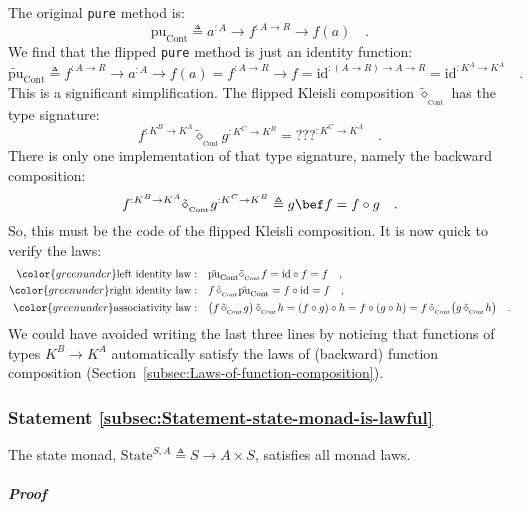 The original \lstinline!pure! method is:
\[
\text{pu}_{\text{Cont}}\triangleq a^{:A}\rightarrow f^{:A\rightarrow R}\rightarrow f(a)\quad.
\]
We find that the flipped \lstinline!pure! method is just an identity
function:
\[
\tilde{\text{pu}}_{\text{Cont}}\triangleq f^{:A\rightarrow R}\rightarrow a^{:A}\rightarrow f(a)=f^{:A\rightarrow R}\rightarrow f=\text{id}^{:\left(A\rightarrow R\right)\rightarrow A\rightarrow R}=\text{id}^{:K^{A}\rightarrow K^{A}}\quad.
\]
This is a significant simplification. The flipped Kleisli composition
$\tilde{\diamond}_{_{\text{Cont}}}$ has the type signature:
\[
f^{:K^{B}\rightarrow K^{A}}\tilde{\diamond}_{_{\text{Cont}}}g^{:K^{C}\rightarrow K^{B}}=\text{???}^{:K^{C}\rightarrow K^{A}}\quad.
\]
There is only one implementation of that type signature, namely the
backward composition:
\[
f^{:K^{B}\rightarrow K^{A}}\tilde{\diamond}_{_{\text{Cont}}}g^{:K^{C}\rightarrow K^{B}}\triangleq g\bef f=f\circ g\quad.
\]
So, this must be the code of the flipped Kleisli composition. It is
now quick to verify the laws:
\begin{align*}
{\color{greenunder}\text{left identity law}:}\quad & \tilde{\text{pu}}_{\text{Cont}}\tilde{\diamond}_{_{\text{Cont}}}f=\text{id}\circ f=f\quad,\\
{\color{greenunder}\text{right identity law}:}\quad & f\,\tilde{\diamond}_{_{\text{Cont}}}\tilde{\text{pu}}_{\text{Cont}}=f\circ\text{id}=f\quad,\\
{\color{greenunder}\text{associativity law}:}\quad & \big(f\,\tilde{\diamond}_{_{\text{Cont}}}g\big)\,\tilde{\diamond}_{_{\text{Cont}}}h=(f\circ g)\circ h=f\circ(g\circ h)=f\,\tilde{\diamond}_{_{\text{Cont}}}\big(g\,\tilde{\diamond}_{_{\text{Cont}}}h\big)\quad.
\end{align*}
We could have avoided writing the last three lines by noticing that
functions of types $K^{B}\rightarrow K^{A}$ automatically satisfy
the laws of (backward) function composition (Section~\ref{subsec:Laws-of-function-composition}).

\subsubsection{Statement \label{subsec:Statement-state-monad-is-lawful}\ref{subsec:Statement-state-monad-is-lawful}}

The state monad, $\text{State}^{S,A}\triangleq S\rightarrow A\times S$,
satisfies all monad laws.

\subparagraph{Proof}

